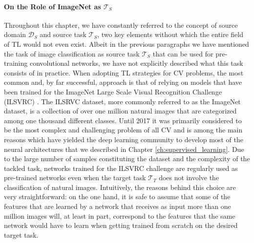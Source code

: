 \paragraph{On the Role of ImageNet as $\mathcal{T}_S$} Throughout this chapter, we have constantly referred to the concept of source domain $\mathcal{D}_S$ and source task $\mathcal{T}_S$, two key elements without which the entire field of TL would not even exist. Albeit in the previous paragraphs we have mentioned the task of image classification as source task $\mathcal{T}_S$ that can be used for pre-training convolutional networks, we have not explicitly described what this task consists of in practice. When adopting TL strategies for CV problems, the most common and, by far successful, approach is that of relying on models that have been trained for the ImageNet Large Scale Visual Recognition Challenge (ILSVRC) \cite{russakovsky2015imagenet}. The ILSRVC dataset, more commonly referred to as the ImageNet dataset, is a collection of over one million natural images that are categorized among one thousand different classes. Until 2017 it was primarily considered to be the most complex and challenging problem of all CV and is among the main reasons which have yielded the deep learning community to develop most of the neural architectures that we described in Chapter \ref{ch:supervised_learning}. Due to the large number of samples constituting the dataset and the complexity of the tackled task, networks trained for the ILSVRC challenge are regularly used as pre-trained networks even when the target task $\mathcal{T}_T$ does not involve the classification of natural images. Intuitively, the reasons behind this choice are very straightforward: on the one hand, it is safe to assume that some of the features that are learned by a network that receives as input more than one million images will, at least in part, correspond to the features that the same network would have to learn when getting trained from scratch on the desired target task.

